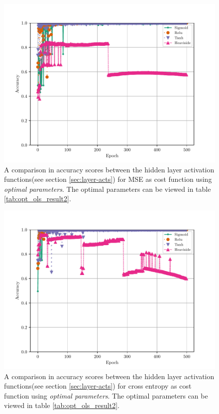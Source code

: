 \begin{figure}[H]
    \centering
    \includegraphics[scale=1.0]{../fig/mlp_epoch_activations_mse_optimal3.pdf}
    \caption{A comparison in accuracy scores between the hidden layer activation functions(see section \ref{sec:layer-acts}) for MSE as cost function using \textit{optimal parameters}. The optimal parameters can be viewed in table \ref{tab:opt_ols_result2}.}
    \label{fig:mlp-epoch-activations-mse-optimal}
\end{figure}

\begin{figure}[H]
    \centering
    \includegraphics[scale=1.0]{../fig/mlp_epoch_activations_log_loss_optimal3.pdf}
    \caption{A comparison in accuracy scores between the hidden layer activation functions(see section \ref{sec:layer-acts}) for cross entropy as cost function using \textit{optimal parameters}. The optimal parameters can be viewed in table \ref{tab:opt_ols_result2}.}
    \label{fig:mlp-epoch-activations-log-loss-optimal}
\end{figure}

